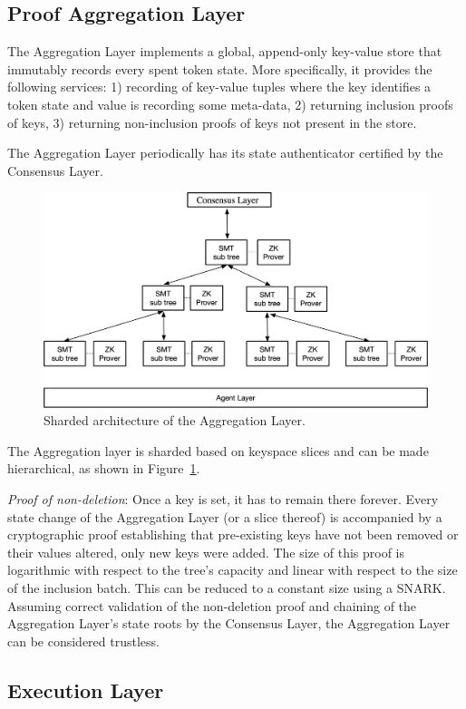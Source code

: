 \documentclass[twocolumn]{article}
\begin{document}
\subsection{Proof Aggregation Layer}

The Aggregation Layer implements a global, append-only key-value store that immutably records every spent token state. More specifically, it provides the following services: 1) recording of key-value tuples where the key identifies a token state and value is recording some meta-data, 2) returning inclusion proofs of keys, 3) returning non-inclusion proofs of keys not present in the store.

The Aggregation Layer periodically has its state authenticator certified by the Consensus Layer.

\begin{figure}[!t]
    \centering
    \includegraphics[width=.7\textwidth]{pic/layers}
    \caption{Sharded architecture of the Aggregation Layer.}\label{fig:sharding}
\end{figure}

The Aggregation layer is sharded based on keyspace slices and can be made hierarchical, as shown in Figure~\ref{fig:sharding}.

\emph{Proof of non-deletion}: Once a key is set, it has to remain there forever. Every state change of the Aggregation Layer (or a slice thereof) is accompanied by a cryptographic proof establishing that pre-existing keys have not been removed or their values altered, only new keys were added. The size of this proof is logarithmic with respect to the tree's capacity and linear with respect to the size of the inclusion batch. This can be reduced to a constant size using a SNARK. Assuming correct validation of the non-deletion proof and chaining of the Aggregation Layer's state roots by the Consensus Layer, the Aggregation Layer can be considered trustless.


\subsection{Execution Layer}
\end{document}
